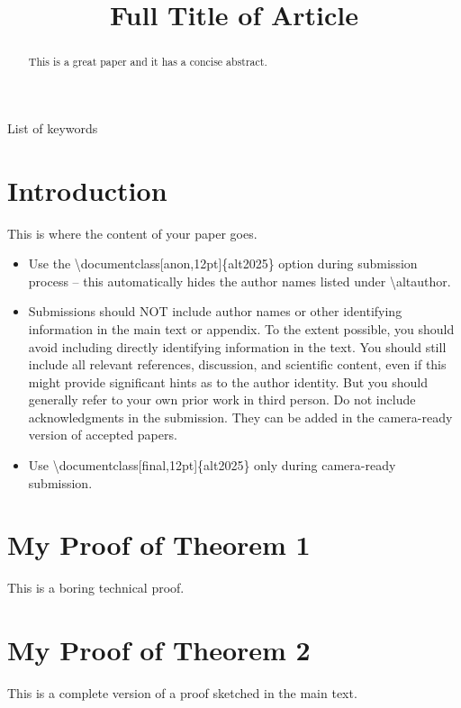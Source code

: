 \documentclass[final,12pt]{alt2025} %
\title[Short Title]{Full Title of Article}
\begin{document}
\maketitle

\begin{abstract}%
  This is a great paper and it has a concise abstract.%
\end{abstract}

\begin{keywords}%
  List of keywords%
\end{keywords}

\section{Introduction}

This is where the content of your paper goes.
\begin{itemize}
  \item Use the \textbackslash documentclass[anon,12pt]\{alt2025\} option during submission process -- this automatically hides the author names listed under \textbackslash altauthor.

  \item Submissions should NOT include author names or other identifying information in the main text or appendix. To the extent possible, you should avoid including directly identifying information in the text. You should still include all relevant references, discussion, and scientific content, even if this might provide significant hints as to the author identity. But you should generally refer to your own prior work in third person. Do not include acknowledgments in the submission. They can be added in the camera-ready version of accepted papers. 
  
  \item Use \textbackslash documentclass[final,12pt]\{alt2025\} only during camera-ready submission.
\end{itemize}






\appendix


\section{My Proof of Theorem 1}

This is a boring technical proof.

\section{My Proof of Theorem 2}

This is a complete version of a proof sketched in the main text.
\end{document}
